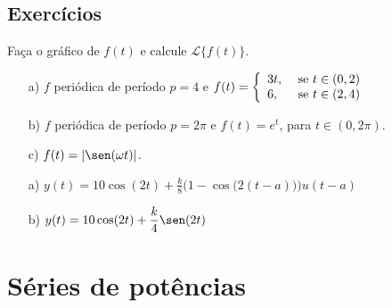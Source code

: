 \subsection*{Exercícios}
\begin{exer}
Faça o gráfico de $f(t)$ e calcule $\mathcal{L}\big\{f(t)\big\}$.
\begin{itemize}
  \item[a)] $f$ periódica de período $p=4$ e $\displaystyle f(t) = \left\{
    \begin{array}{ll}
      3t, & \hbox{ se } t \in (0,2) \\
      6, & \hbox{ se } t \in (2,4)
    \end{array}
  \right.
$
  \item[b)] $f$ periódica de período $p=2\pi$ e $\displaystyle f(t) = e^t$, para $t \in (0,2\pi)$.
  \item[c)] $\displaystyle f(t) = |\sen (\omega t)|$.
\end{itemize}
\end{exer}
\begin{resp}
 \begin{itemize}
  \item[a)] $\displaystyle y(t) = 10 \cos (2t) + \frac{k}{8} \Big( 1 - \cos \big(2(t-a)\big) \Big)u(t-a) $
  \item[b)] $\displaystyle y(t) = 10 \cos (2t) + \frac{k}{4} \sen(2t)$
 \end{itemize}
\end{resp}

\section{Séries de potências}
